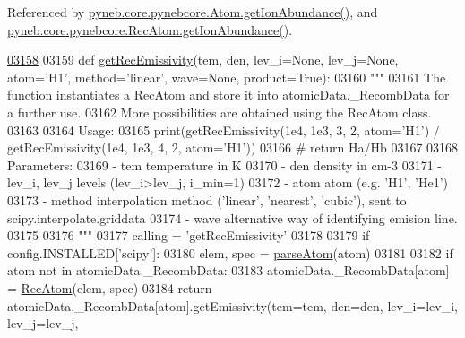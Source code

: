 Referenced by \hyperlink{pynebcore_8py_source_l02176}{pyneb.\-core.\-pynebcore.\-Atom.\-get\-Ion\-Abundance()}, and \hyperlink{pynebcore_8py_source_l03083}{pyneb.\-core.\-pynebcore.\-Rec\-Atom.\-get\-Ion\-Abundance()}.


\begin{DoxyCode}
\hypertarget{namespacepyneb_1_1core_1_1pynebcore_l03158}{}\hyperlink{namespacepyneb_1_1core_1_1pynebcore_aba9d4a5306330dd47f8a51455514c017}{03158} 
03159 \textcolor{keyword}{def }\hyperlink{namespacepyneb_1_1core_1_1pynebcore_aba9d4a5306330dd47f8a51455514c017}{getRecEmissivity}(tem, den, lev\_i=None, lev\_j=None, atom='H1', method='linear', 
      wave=None, product=True):
03160     \textcolor{stringliteral}{"""}
03161 \textcolor{stringliteral}{    The function instantiates a RecAtom and store it into atomicData.\_RecombData for a further use.}
03162 \textcolor{stringliteral}{    More possibilities are obtained using the RecAtom class.}
03163 \textcolor{stringliteral}{}
03164 \textcolor{stringliteral}{    Usage:}
03165 \textcolor{stringliteral}{        print(getRecEmissivity(1e4, 1e3, 3, 2, atom='H1') / getRecEmissivity(1e4, 1e3, 4, 2, atom='H1')) }
03166 \textcolor{stringliteral}{            # return Ha/Hb }
03167 \textcolor{stringliteral}{}
03168 \textcolor{stringliteral}{    Parameters:}
03169 \textcolor{stringliteral}{        - tem           temperature in K}
03170 \textcolor{stringliteral}{        - den           density in cm-3}
03171 \textcolor{stringliteral}{        - lev\_i, lev\_j  levels (lev\_i>lev\_j, i\_min=1)}
03172 \textcolor{stringliteral}{        - atom          atom (e.g. 'H1', 'He1')}
03173 \textcolor{stringliteral}{        - method        interpolation method ('linear', 'nearest', 'cubic'), sent to
       scipy.interpolate.griddata}
03174 \textcolor{stringliteral}{        - wave          alternative way of identifying emision line.}
03175 \textcolor{stringliteral}{        }
03176 \textcolor{stringliteral}{    """}
03177     calling = \textcolor{stringliteral}{'getRecEmissivity'}
03178     
03179     \textcolor{keywordflow}{if} config.INSTALLED[\textcolor{stringliteral}{'scipy'}]:
03180         elem, spec = \hyperlink{namespacepyneb_1_1utils_1_1misc_a2bb6f906a75f26a882093e9ce9272507}{parseAtom}(atom)
03181     
03182         \textcolor{keywordflow}{if} atom \textcolor{keywordflow}{not} \textcolor{keywordflow}{in} atomicData.\_RecombData:
03183             atomicData.\_RecombData[atom] = \hyperlink{classpyneb_1_1core_1_1pynebcore_1_1_rec_atom}{RecAtom}(elem, spec)
03184         \textcolor{keywordflow}{return} atomicData.\_RecombData[atom].getEmissivity(tem=tem, den=den, lev\_i=lev\_i, lev\_j=lev\_j,

\end{DoxyCode}
